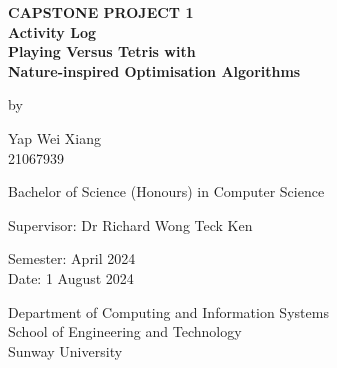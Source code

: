 \documentclass[a4paper, 12pt]{extreport}
\begin{document}
	
	\onehalfspacing
	
	\begin{titlepage}
	
	\centering
	
	\vspace{.5cm}
	
	\begin{center}
		\textbf{\large CAPSTONE PROJECT 1} \\
		\textbf{\large Activity Log} \\
		\vspace{1cm}
		\textbf{\large Playing Versus Tetris with \\ Nature-inspired Optimisation Algorithms}
		
		\vspace{1cm}
		
		by
		
		\vspace{1cm}
		
		\large Yap Wei Xiang \\
		21067939
		
		\vspace{1cm}
		
		Bachelor of Science (Honours) in Computer Science
		
		\vspace{1cm}
		
		\large Supervisor: Dr Richard Wong Teck Ken
		
		\vspace{1cm}
		
		\normalsize Semester: April 2024 \\
		Date: 1 August 2024
		
		\vfill
		
		Department of Computing and Information Systems\\
		School of Engineering and Technology\\
		Sunway University
	\end{center}
	
\end{titlepage}
	
\end{document}
